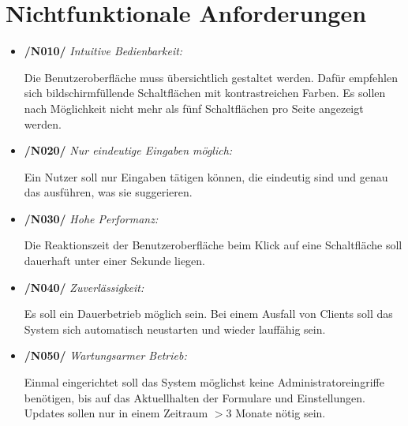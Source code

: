 \section{Nichtfunktionale Anforderungen}
\vspace{1cm}

\begin{itemize}
    \item \textbf{/N010/} \textit{Intuitive Bedienbarkeit:} \par
    Die Benutzeroberfläche muss übersichtlich gestaltet werden. Dafür empfehlen sich bildschirmfüllende Schaltflächen mit kontrastreichen Farben. Es sollen nach Möglichkeit nicht mehr als fünf Schaltflächen pro Seite angezeigt werden. 
    
    \item \textbf{/N020/} \textit{Nur eindeutige Eingaben möglich:} \par
    Ein Nutzer soll nur Eingaben tätigen können, die eindeutig sind und genau das ausführen, was sie suggerieren.
    
    \item \textbf{/N030/} \textit{Hohe Performanz:} \par
    Die Reaktionszeit der Benutzeroberfläche beim Klick auf eine Schaltfläche soll dauerhaft unter einer Sekunde liegen.
    
    \item \textbf{/N040/} \textit{Zuverlässigkeit:} \par
    Es soll ein Dauerbetrieb möglich sein. Bei einem Ausfall von Clients soll das System sich automatisch neustarten und wieder lauffähig sein.
    
    \item \textbf{/N050/} \textit{Wartungsarmer Betrieb:} \par
    Einmal eingerichtet soll das System möglichst keine Administratoreingriffe benötigen, bis auf das Aktuellhalten der Formulare und Einstellungen. Updates sollen nur in einem Zeitraum $> 3$ Monate nötig sein.
\end{itemize}{}
